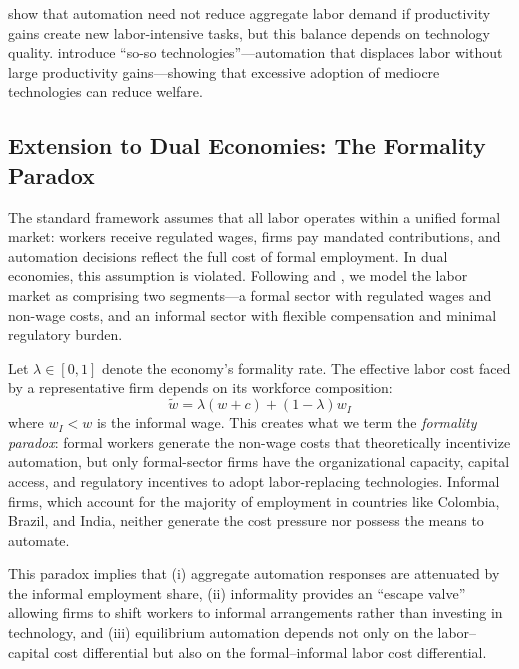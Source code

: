 \documentclass[5p,times,authoryear]{elsarticle}
\begin{document}
\citet{acemoglu2022tasks} show that automation need not reduce aggregate labor demand if productivity gains create new labor-intensive tasks, but this balance depends on technology quality. \citet{acemoglu2020taxes} introduce ``so-so technologies''---automation that displaces labor without large productivity gains---showing that excessive adoption of mediocre technologies can reduce welfare.

\subsection{Extension to Dual Economies: The Formality Paradox}
\label{subsec:dual_economy}

The standard framework assumes that all labor operates within a unified formal market: workers receive regulated wages, firms pay mandated contributions, and automation decisions reflect the full cost of formal employment. In dual economies, this assumption is violated. Following \citet{laporta2014} and \citet{ulyssea2018}, we model the labor market as comprising two segments---a formal sector with regulated wages and non-wage costs, and an informal sector with flexible compensation and minimal regulatory burden.

Let $\lambda \in [0,1]$ denote the economy's formality rate. The effective labor cost faced by a representative firm depends on its workforce composition:
\begin{equation}
\label{eq:effective_cost}
\tilde{w} = \lambda(w + c) + (1-\lambda) w_I
\end{equation}
where $w_I < w$ is the informal wage. This creates what we term the \emph{formality paradox}: formal workers generate the non-wage costs that theoretically incentivize automation, but only formal-sector firms have the organizational capacity, capital access, and regulatory incentives to adopt labor-replacing technologies. Informal firms, which account for the majority of employment in countries like Colombia, Brazil, and India, neither generate the cost pressure nor possess the means to automate.

This paradox implies that (i) aggregate automation responses are attenuated by the informal employment share, (ii) informality provides an ``escape valve'' allowing firms to shift workers to informal arrangements rather than investing in technology, and (iii) equilibrium automation depends not only on the labor--capital cost differential but also on the formal--informal labor cost differential.
\end{document}
